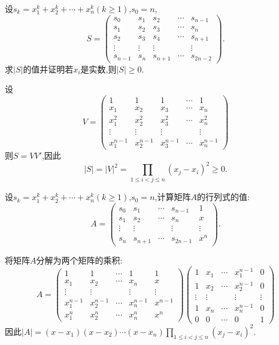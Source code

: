 \documentclass[../../main.tex]{subfiles}%
\begin{document}
\begin{example}
设\(s_k = x_1^k + x_2^k+\cdots+x_n^k(k\geqslant 1)\),\(s_0 = n\),
\[
S = 
\begin{pmatrix}
s_0 & s_1 & s_2 & \cdots & s_{n - 1}\\
s_1 & s_2 & s_3 & \cdots & s_{n}\\
s_2 & s_3 & s_4 & \cdots & s_{n + 1}\\
\vdots & \vdots & \vdots & & \vdots\\
s_{n - 1} & s_{n} & s_{n + 1} & \cdots & s_{2n - 2}
\end{pmatrix}.
\]
求\(|S|\)的值并证明若\(x_i\)是实数,则\(|S|\geqslant 0\).
\end{example}
\begin{solution}
设
\[
V = 
\begin{pmatrix}
1 & 1 & 1 & \cdots & 1\\
x_1 & x_2 & x_3 & \cdots & x_n\\
x_1^2 & x_2^2 & x_3^2 & \cdots & x_n^2\\
\vdots & \vdots & \vdots & & \vdots\\
x_1^{n - 1} & x_2^{n - 1} & x_3^{n - 1} & \cdots & x_n^{n - 1}
\end{pmatrix}
\]
则\(S = VV'\),因此
\[
|S| = |V|^2=\prod_{1\leqslant  i<j\leqslant  n}(x_j - x_i)^2\geqslant 0.
\]

\end{solution}

\begin{example}
设\(s_k = x_1^k + x_2^k+\cdots + x_n^k(k\geqslant 1)\),\(s_0 = n\),计算矩阵\(A\)的行列式的值:
\[
A = 
\begin{pmatrix}
s_0 & s_1 & \cdots & s_{n - 1} & 1\\
s_1 & s_2 & \cdots & s_n & x\\
\vdots & \vdots & & \vdots & \vdots\\
s_n & s_{n + 1} & \cdots & s_{2n - 1} & x^n
\end{pmatrix}.
\]
\end{example}
\begin{solution}
将矩阵\(A\)分解为两个矩阵的乘积:
\[
A = 
\begin{pmatrix}
1 & 1 & \cdots & 1 & 1\\
x_1 & x_2 & \cdots & x_n & x\\
\vdots & \vdots & & \vdots & \vdots\\
x_1^{n - 1} & x_2^{n - 1} & \cdots & x_n^{n - 1} & x^{n - 1}\\
x_1^n & x_2^n & \cdots & x_n^n & x^n
\end{pmatrix}
\begin{pmatrix}
1 & x_1 & \cdots & x_1^{n - 1} & 0\\
1 & x_2 & \cdots & x_2^{n - 1} & 0\\
\vdots & \vdots & & \vdots & \vdots\\
1 & x_n & \cdots & x_n^{n - 1} & 0\\
0 & 0 & \cdots & 0 & 1
\end{pmatrix}
\]
因此\(|A|=(x - x_1)(x - x_2)\cdots(x - x_n)\prod_{1\leqslant  i < j\leqslant  n}(x_j - x_i)^2\).

\end{solution}
\end{document}
